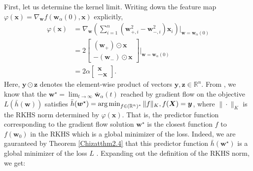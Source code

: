 \documentclass{article}
\DeclareMathOperator*{\argmin}{arg\,min}
\begin{document}
First, let us determine the kernel limit. Writing down the feature map $\varphi(\boldsymbol{x}) = \nabla_{\boldsymbol{w}} f(\boldsymbol{w}_{\alpha}(0), \boldsymbol{x})$ explicitly, 
\begin{align*}
    \varphi(\boldsymbol{x}) &= \nabla_{\boldsymbol{w}}\left( \sum_{i=1}^n(\boldsymbol{w}_{+, i}^2 - \boldsymbol{w}_{-, i}^2)\boldsymbol{x}_i \right)\bigg|_{\boldsymbol{w} = \boldsymbol{w}_{\alpha}(0)}\\
    &= 
    2\begin{bmatrix}
        (\boldsymbol{w}_+) \odot \boldsymbol{x}\\
        -(\boldsymbol{w}_-) \odot \boldsymbol{x}
    \end{bmatrix} \bigg|_{\boldsymbol{w} = \boldsymbol{w}_{\alpha}(0)}\\
    &= 2\alpha \begin{bmatrix}
        \boldsymbol{x}\\
        -\boldsymbol{x}
    \end{bmatrix}.
\end{align*}
Here, $\boldsymbol{y} \odot \boldsymbol{z}$ denotes the element-wise product of vectors $\boldsymbol{y}, \boldsymbol{z} \in \mathbb{R}^n$. From \cite{woodworth2020kernel}, we know that the $\boldsymbol{w}^{\star} = \lim_{t \to \infty} \boldsymbol{\bar{w}}_{\alpha}(t)$ reached by gradient flow on the objective $L(\bar{h}(\boldsymbol{w}))$ satisfies $\bar{h}(\boldsymbol{w}^{\star}) = \argmin_{f \in (\mathbb{R}^n)^*} \| f \|_{K}, \\ f(\boldsymbol{X}) = \boldsymbol{y}$, where $\| \cdot \|_K$ is the RKHS norm determined by $\varphi(\boldsymbol{x})$. That is, the predictor function corresponding to the gradient flow solution $\boldsymbol{w}^{\star}$ is the closest function $f$ to $f(\boldsymbol{w}_0)$ in the RKHS which is a global minimizer of the loss. Indeed, we are gauranteed by Theorem \ref{Chizatthm2.4} that this predictor function $\bar{h}(\boldsymbol{w}^{\star})$ is a global minimizer of the loss $L$ \cite{chizat2018lazy}. Expanding out the definition of the RKHS norm, we get:
\end{document}
